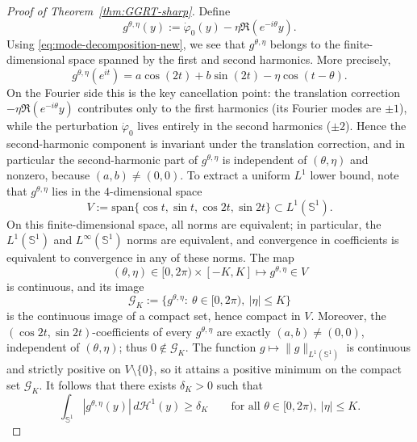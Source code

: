 \documentclass[a4paper,11pt,reqno]{amsart}
\numberwithin{equation}{section}
\theoremstyle{plain} %
\theoremstyle{definition} %
\theoremstyle{remark}
\begin{document}
\begin{proof}[Proof of Theorem~\ref{thm:GGRT-sharp}]
Define
\[
g^{\theta,\eta}(y)
:=
\dot\varphi_0(y)-\eta \Re(e^{-i\theta}y).
\]
Using \eqref{eq:mode-decomposition-new}, we see that $g^{\theta,\eta}$ belongs
to the finite-dimensional space spanned by the first and second harmonics.
More precisely,
\[
g^{\theta,\eta}(e^{it})
=
a\cos(2t)+b\sin(2t)-\eta \cos(t-\theta).
\]
On the Fourier side this is the key cancellation point: the translation
correction $-\eta\Re(e^{-i\theta}y)$ contributes only to the first harmonics
(its Fourier modes are $\pm 1$), while the perturbation
$\dot\varphi_0$ lives entirely in the second harmonics ($\pm 2$). Hence the
second-harmonic component is invariant under the translation correction, and
in particular the second-harmonic part of $g^{\theta,\eta}$ is independent of
$(\theta,\eta)$ and nonzero, because $(a,b)\neq (0,0)$. To extract a uniform \(L^1\) lower bound, note that
\(g^{\theta,\eta}\) lies in the \(4\)-dimensional space
\[
V:=\mathrm{span}\bigl\{\cos t,\sin t,\cos 2t,\sin 2t\bigr\}\subset L^1(\mathbb S^1).
\]
On this finite-dimensional space, all norms are equivalent; in particular, the
\(L^1(\mathbb S^1)\) and \(L^\infty(\mathbb S^1)\) norms are equivalent, and
convergence in coefficients is equivalent to convergence in any of these norms. The map
\[
(\theta,\eta)\in [0,2\pi)\times [-K,K]\longmapsto g^{\theta,\eta}\in V
\]
is continuous, and its image
\[
\mathcal G_K:=\{g^{\theta,\eta}:\ \theta\in[0,2\pi),\ |\eta|\leq K\}
\]
is the continuous image of a compact set, hence compact in \(V\). Moreover, the
\((\cos 2t,\sin 2t)\)-coefficients of every \(g^{\theta,\eta}\) are exactly
\((a,b)\neq (0,0)\), independent of \((\theta,\eta)\); thus \(0\notin
\mathcal G_K\). The function \(g\mapsto\|g\|_{L^1(\mathbb S^1)}\) is continuous
and strictly positive on \(V\setminus\{0\}\), so it attains a positive minimum
on the compact set \(\mathcal G_K\). It follows that there exists
$\delta_K>0$ such that
\begin{equation}\label{eq:uniform-l1-lower-new}
\int_{\mathbb S^1}|g^{\theta,\eta}(y)|\,d\mathcal H^1(y)\geq \delta_K
\qquad
\text{for all }\theta\in[0,2\pi),\ |\eta|\leq K.
\end{equation}


\end{proof}
\end{document}
